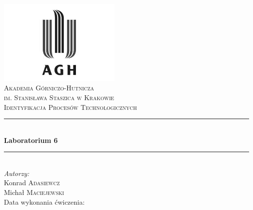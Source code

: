 \begin{titlepage}

\newcommand{\HRule}{\rule{\linewidth}{0.5mm}}

\center
 

\includegraphics[width=6cm]{../res/img/logo.png}\\[1cm]
 
 

\textsc{\LARGE Akademia Górniczo-Hutnicza \\[0.2cm]
im. Stanisława Staszica w Krakowie}\\[1.5cm]

\textsc{\Large Identyfikacja Procesów Technologicznych}\\[0.5cm]


\HRule \\[0.5cm]
{ \huge \bfseries Laboratorium 6}\\[0.3cm]
\HRule \\[1.5cm]

\flushright
\Large \emph{Autorzy:}\\
Konrad \textsc{Adasiewcz}\\[0.1cm]  %
Michał \textsc{Maciejewski}\\[3cm]  %

Data wykonania ćwiczenia: \\
{\large {}}\\[1cm]


\vfill %

\end{titlepage}
